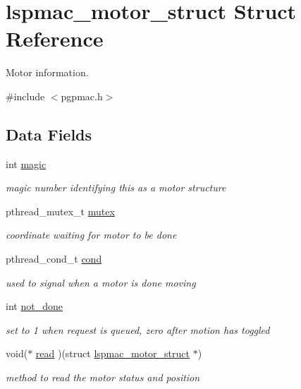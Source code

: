 \hypertarget{structlspmac__motor__struct}{\section{lspmac\-\_\-motor\-\_\-struct Struct Reference}
\label{structlspmac__motor__struct}
}


Motor information.  




{\ttfamily \#include $<$pgpmac.\-h$>$}

\subsection*{Data Fields}
\begin{DoxyCompactItemize}
\item 
int \hyperlink{structlspmac__motor__struct_a3342670c97c0b2646409f2ef28f63d1c}{magic}
\begin{DoxyCompactList}\small\item\em magic number identifying this as a motor structure \end{DoxyCompactList}\item 
pthread\-\_\-mutex\-\_\-t \hyperlink{structlspmac__motor__struct_a188c5b1e991750ce2ffd53e0192e0907}{mutex}
\begin{DoxyCompactList}\small\item\em coordinate waiting for motor to be done \end{DoxyCompactList}\item 
pthread\-\_\-cond\-\_\-t \hyperlink{structlspmac__motor__struct_aa0ea4108b8fed5b41ff91ca7266f3d84}{cond}
\begin{DoxyCompactList}\small\item\em used to signal when a motor is done moving \end{DoxyCompactList}\item 
int \hyperlink{structlspmac__motor__struct_ab7bd8bff48953ce05c758598d75877ac}{not\-\_\-done}
\begin{DoxyCompactList}\small\item\em set to 1 when request is queued, zero after motion has toggled \end{DoxyCompactList}\item 
void($\ast$ \hyperlink{structlspmac__motor__struct_ac62692eb939c04ca35e939d1c3acfe8f}{read} )(struct \hyperlink{structlspmac__motor__struct}{lspmac\-\_\-motor\-\_\-struct} $\ast$)
\begin{DoxyCompactList}\small\item\em method to read the motor status and position \end{DoxyCompactList}\item 

\end{DoxyCompactItemize}
